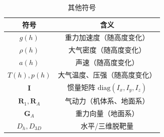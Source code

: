\begin{thesisappendix}
\begin{table}[H]
\caption{其他符号}
\label{tab:sym_other}
\begin{tabularx}{\textwidth}{>{\hsize}C >{\hsize}C}
\toprule
符号 & 含义 \\
\midrule
$g(h)$ & 重力加速度（随高度变化） \\
$\rho(h)$ & 大气密度（随高度变化） \\
$a(h)$ & 声速（随高度变化） \\
$T(h),p(h)$ & 大气温度、压强（随高度变化） \\
$\mathbf I$ & 惯量矩阵 $\mathrm{diag}(I_x,I_y,I_z)$ \\
$\mathbf R_1,\mathbf R_A$ & 气动力（机体系、地面系） \\
$\mathbf G_A$ & 重力向量（地面系） \\
$D_h,D_{3D}$ & 水平/三维脱靶量 \\
\bottomrule
\end{tabularx}
\end{table}

\end{thesisappendix}